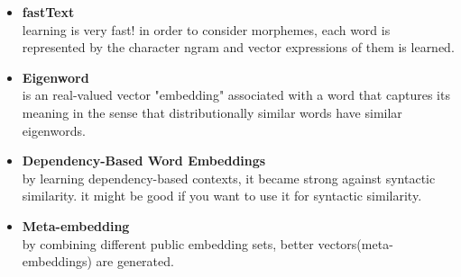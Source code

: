  \begin{itemize}
     \item \textbf{fastText}\\
     learning is very fast! in order to consider morphemes, each word is represented by the character ngram and vector expressions of them is learned\cite{web004}.
     \item \textbf{Eigenword}\\
     is an real-valued vector "embedding" associated with a word that captures its meaning in the sense that distributionally similar words have similar eigenwords.
     
     \item  \textbf{Dependency-Based Word Embeddings}\\
      by learning dependency-based contexts, it became strong against syntactic similarity. it might be good if you want to use it for syntactic similarity\cite{levy2014dependencybased}.
      
      \item \textbf{ Meta-embedding}\\
     by combining different public embedding sets, better vectors(meta-embeddings) are generated\cite{DBLP:conf/acl/YinS16}.
 \end{itemize} 